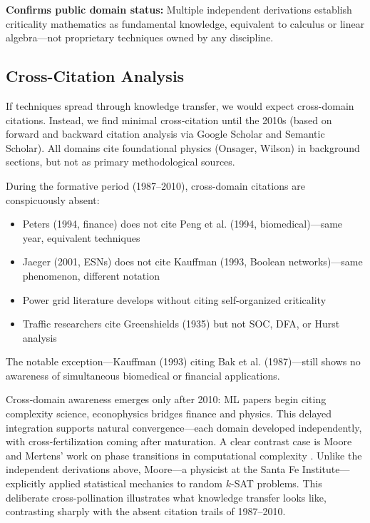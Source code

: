 \documentclass[11pt]{article}
\begin{document}
\textbf{Confirms public domain status:} Multiple independent derivations establish criticality mathematics as fundamental knowledge, equivalent to calculus or linear algebra---not proprietary techniques owned by any discipline.

\subsection{Cross-Citation Analysis}

If techniques spread through knowledge transfer, we would expect cross-domain citations. Instead, we find minimal cross-citation until the 2010s (based on forward and backward citation analysis via Google Scholar and Semantic Scholar). All domains cite foundational physics (Onsager, Wilson) in background sections, but not as primary methodological sources.

During the formative period (1987--2010), cross-domain citations are conspicuously absent:
\begin{itemize}[nosep]
    \item Peters (1994, finance) does not cite Peng et al. (1994, biomedical)---same year, equivalent techniques
    \item Jaeger (2001, ESNs) does not cite Kauffman (1993, Boolean networks)---same phenomenon, different notation
    \item Power grid literature develops without citing self-organized criticality
    \item Traffic researchers cite Greenshields (1935) but not SOC, DFA, or Hurst analysis
\end{itemize}
The notable exception---Kauffman (1993) citing Bak et al. (1987)---still shows no awareness of simultaneous biomedical or financial applications.

Cross-domain awareness emerges only after 2010: ML papers begin citing complexity science, econophysics bridges finance and physics. This delayed integration supports natural convergence---each domain developed independently, with cross-fertilization coming after maturation. A clear contrast case is Moore and Mertens' work on phase transitions in computational complexity \cite{moore2011}. Unlike the independent derivations above, Moore---a physicist at the Santa Fe Institute---explicitly applied statistical mechanics to random $k$-SAT problems. This deliberate cross-pollination illustrates what knowledge transfer looks like, contrasting sharply with the absent citation trails of 1987--2010.
\end{document}
